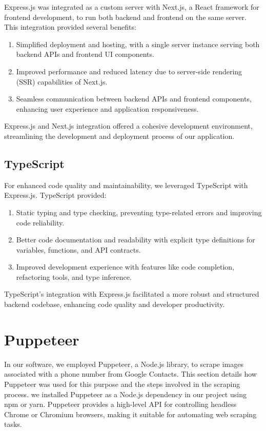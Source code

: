 Express.js was integrated as a custom server with Next.js, a React framework for frontend development, to run both backend and frontend on the same server. This integration provided several benefits:

\begin{enumerate}
  \item Simplified deployment and hosting, with a single server instance serving both backend APIs and frontend UI components.
  \item Improved performance and reduced latency due to server-side rendering (SSR) capabilities of Next.js.
  \item Seamless communication between backend APIs and frontend components, enhancing user experience and application responsiveness.
\end{enumerate}

Express.js and Next.js integration offered a cohesive development environment, streamlining the development and deployment process of our application.

\subsection{TypeScript}

For enhanced code quality and maintainability, we leveraged TypeScript with Express.js. TypeScript provided:

\begin{enumerate}
  \item Static typing and type checking, preventing type-related errors and improving code reliability.
  \item Better code documentation and readability with explicit type definitions for variables, functions, and API contracts.
  \item Improved development experience with features like code completion, refactoring tools, and type inference.
\end{enumerate}

TypeScript's integration with Express.js facilitated a more robust and structured backend codebase, enhancing code quality and developer productivity.


\section{Puppeteer}

In our software, we employed Puppeteer, a Node.js library, to scrape images associated with a phone number from Google Contacts. This section details how Puppeteer was used for this purpose and the steps involved in the scraping process. we installed Puppeteer as a Node.js dependency in our project using npm or yarn. Puppeteer provides a high-level API for controlling headless Chrome or Chromium browsers, making it suitable for automating web scraping tasks.


